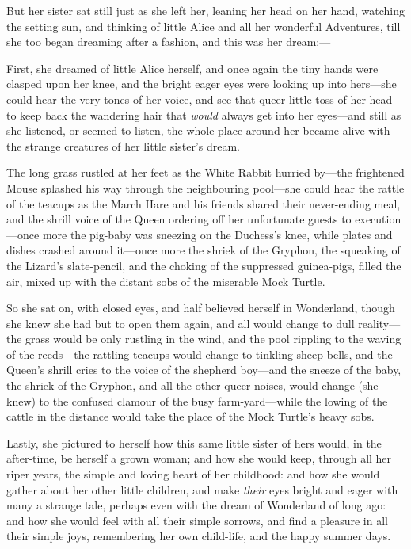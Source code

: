 \documentclass[11pt,openany,oneside]{book}
\begin{document}
\par\medskip{\centering\rule{0.3\linewidth}{0.4pt}\par}\medskip
But her sister sat still just as she left her, leaning her head on her hand, watching the setting sun, and thinking of little Alice and all her wonderful Adventures, till she too began dreaming after a fashion, and this was her dream:— 

First, she dreamed of little Alice herself, and once again the tiny hands were clasped upon her knee, and the bright eager eyes were looking up into hers—she could hear the very tones of her voice, and see that queer little toss of her head to keep back the wandering hair that {\em would\/} always get into her eyes—and still as she listened, or seemed to listen, the whole place around her became alive with the strange creatures of her little sister’s dream. 

The long grass rustled at her feet as the White Rabbit hurried by—the frightened Mouse splashed his way through the neighbouring pool—she could hear the rattle of the teacups as the March Hare and his friends shared their never-ending meal, and the shrill voice of the Queen ordering off her unfortunate guests to execution—once more the pig-baby was sneezing on the Duchess’s knee, while plates and dishes crashed around it—once more the shriek of the Gryphon, the squeaking of the Lizard’s slate-pencil, and the choking of the suppressed guinea-pigs, filled the air, mixed up with the distant sobs of the miserable Mock Turtle. 

So she sat on, with closed eyes, and half believed herself in Wonderland, though she knew she had but to open them again, and all would change to dull reality—the grass would be only rustling in the wind, and the pool rippling to the waving of the reeds—the rattling teacups would change to tinkling sheep-bells, and the Queen’s shrill cries to the voice of the shepherd boy—and the sneeze of the baby, the shriek of the Gryphon, and all the other queer noises, would change (she knew) to the confused clamour of the busy farm-yard—while the lowing of the cattle in the distance would take the place of the Mock Turtle’s heavy sobs. 

Lastly, she pictured to herself how this same little sister of hers would, in the after-time, be herself a grown woman; and how she would keep, through all her riper years, the simple and loving heart of her childhood: and how she would gather about her other little children, and make {\em their\/} eyes bright and eager with many a strange tale, perhaps even with the dream of Wonderland of long ago: and how she would feel with all their simple sorrows, and find a pleasure in all their simple joys, remembering her own child-life, and the happy summer days. 
\end{document}
